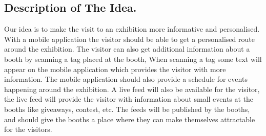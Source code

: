 \subsection*{Description of The Idea.}
Our idea is to make the visit to an exhibition more informative and personalised.  With a mobile application the visitor should be able to get a personalised  route around the exhibition. The visitor can also get additional information about a booth by scanning a tag placed at the booth, When scanning a tag some text will appear on the mobile application which provides the visitor with more information. The mobile application should also provide a schedule for events happening around the exhibition. A live feed will also be available for the visitor, the live feed will provide the visitor with information about small events at the booths like giveaways, contest, etc. The feeds will be published by the booths, and should give the booths a place where they can make themselves attractable for the visitors.